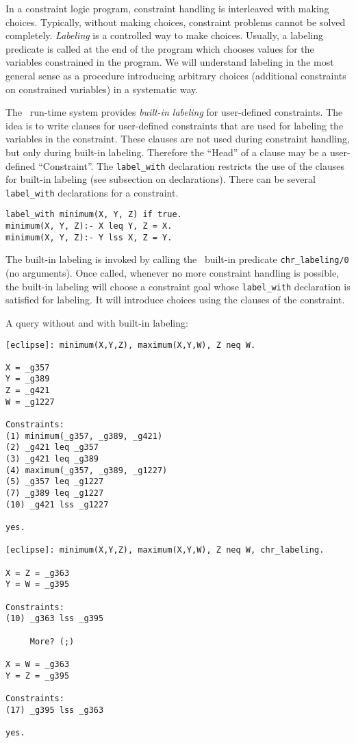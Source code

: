 In a constraint logic program, constraint handling is interleaved
with making choices. Typically, without making choices, constraint
problems cannot be solved completely. {\em Labeling}
is a controlled
way to make choices. Usually, a labeling predicate is called
at the end of the program which chooses values for the variables
constrained in the program. 
%
We will understand labeling in the most general sense as a procedure
introducing arbitrary choices (additional constraints on constrained
variables) in a systematic way.

The \chr\ run-time system provides {\em built-in labeling} for
user-defined constraints. The idea is to write clauses for
user-defined constraints that are used for labeling the variables in
the constraint. These clauses are not used during constraint handling,
but only during built-in labeling. Therefore the ``Head'' of a clause may
be a user-defined ``Constraint''.
%
The {\tt label\_with} declaration restricts the use of the 
clauses for built-in labeling (see subsection on declarations).  There
can be several {\tt label\_with} declarations for a constraint.

 \begin{verbatim}
label_with minimum(X, Y, Z) if true.
minimum(X, Y, Z):- X leq Y, Z = X.
minimum(X, Y, Z):- Y lss X, Z = Y.
\end{verbatim}

The built-in labeling is invoked by calling the \chr\ built-in predicate
{\tt chr\_labeling/0} (no arguments). Once called, whenever no more
constraint handling is possible, the built-in labeling will choose a
constraint goal whose {\tt label\_with} declaration is satisfied for
labeling. It will introduce choices using the clauses of the constraint.

A query without and with built-in labeling: \begin{verbatim}
[eclipse]: minimum(X,Y,Z), maximum(X,Y,W), Z neq W.

X = _g357
Y = _g389
Z = _g421
W = _g1227
 
Constraints:
(1) minimum(_g357, _g389, _g421)
(2) _g421 leq _g357
(3) _g421 leq _g389
(4) maximum(_g357, _g389, _g1227)
(5) _g357 leq _g1227
(7) _g389 leq _g1227
(10) _g421 lss _g1227

yes.

[eclipse]: minimum(X,Y,Z), maximum(X,Y,W), Z neq W, chr_labeling.

X = Z = _g363
Y = W = _g395
 
Constraints:
(10) _g363 lss _g395

     More? (;) 

X = W = _g363
Y = Z = _g395

Constraints:
(17) _g395 lss _g363

yes.
\end{verbatim}

